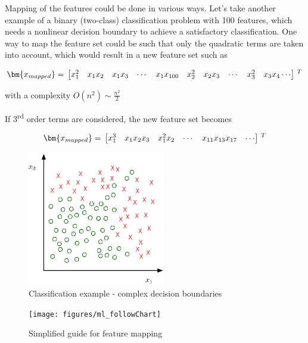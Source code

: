 Mapping of the features could be done in various ways. 
Let's take another example of a binary (two-class) classification problem with 100 features, which needs a nonlinear decision boundary to achieve a satisfactory classification.
One way to map the feature set could be such that only the quadratic terms are taken into account, which would result in a new feature set such as
 
\begin{equation}{\label{eqn:featureMapping3}}
\bm{x_{mapped}}
=\,
\begin{bmatrix}
x_1^2 & x_1x_2 & x_1x_3 & \cdots & x_1x_{100} & x_2^2 & x_2x_3 & \cdots & x_3^2 & x_3x_4  \cdots  
\end{bmatrix}
\,^ T
\end{equation} 

with a complexity $O(n^2) \sim \frac{n^2}{2}$

If 3\textsuperscript{rd} order terms are considered, the new feature set becomes

\begin{equation}{\label{eqn:featureMapping4}}
\bm{x_{mapped}}
=\,
\begin{bmatrix}
x_1^3 & x_1x_2x_3 & x_1^2x_2 & \cdots  & x_{11}x_{13}x_{17} & \cdots  
\end{bmatrix}
\,^ T
\end{equation} 

\begin{figure}
\begin{center}
\includegraphics[width=6cm]{figures/complexDecisionBoundary}    %
\caption{Classification example - complex decision boundaries} 
\label{fig:complexBoundary}
\end{center}
\end{figure}

\begin{figure}
\begin{center}
\texttt{[image: figures/ml\_followChart]}    %
\caption{Simplified guide for feature mapping} 
\label{fig:ml_followChart}
\end{center}
\end{figure}


